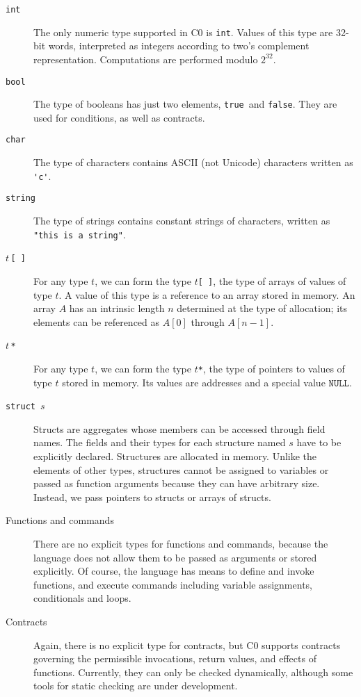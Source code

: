 \documentclass[11pt]{article}
\newcommand{\tint}{\texttt{int}}
\newcommand{\tbool}{\texttt{bool}}
\newcommand{\vtrue}{\texttt{true}}
\newcommand{\vfalse}{\texttt{false}}
\newcommand{\tstring}{\texttt{string}}
\newcommand{\tchar}{\texttt{char}}
\newcommand{\tarray}{\texttt{[\,]}}
\newcommand{\tstar}{\texttt{*}}
\newcommand{\vnull}{\texttt{NULL}}
\newcommand{\tstruct}{\texttt{struct}}
\begin{document}
\begin{description}
\item[\tint] The only numeric type supported in C0 is \tint.  Values of
  this type are 32-bit words, interpreted as integers according to
  two's complement representation.  Computations are performed
  modulo $2^{32}$.
\item[\tbool] The type of booleans has just two elements, \vtrue\ and \vfalse.
  They are used for conditions, as well as contracts.
\item[\tchar] The type of characters contains ASCII (not Unicode)
  characters written as \lstinline!'c'!.
\item[\tstring] The type of strings contains constant strings of
  characters, written as \lstinline'"this is a string"'.
\item[$t$\,\tarray] For any type $t$, we can form the type $t$\tarray,
  the type of arrays of values of type $t$.  A value of this type is a
  reference to an array stored in memory.  An array $A$ has an
  intrinsic length $n$ determined at the type of allocation; its
  elements can be referenced as $A[0]$ through $A[n-1]$.
\item[$t$\,\tstar] For any type $t$, we can form the type $t$\tstar, the
  type of pointers to values of type $t$ stored in memory.  Its values
  are addresses and a special value $\vnull$.
\item[\tstruct\ $s$] Structs are aggregates whose members can be
  accessed through field names.  The fields and their types for each
  structure named $s$ have to be explicitly declared.  Structures are
  allocated in memory.  Unlike the elements of other types, structures
  cannot be assigned to variables or passed as function arguments
  because they can have arbitrary size.  Instead, we pass pointers to
  structs or arrays of structs.
\item[Functions and commands] There are no explicit types for
  functions and commands, because the language does not allow them to
  be passed as arguments or stored explicitly.  Of course, the
  language has means to define and invoke functions, and execute
  commands including variable assignments, conditionals and loops.
\item[Contracts] Again, there is no explicit type for contracts,
  but C0 supports contracts governing the permissible invocations,
  return values, and effects of functions.  Currently, they can only
  be checked dynamically, although some tools for static checking
  are under development.
\end{description}
\end{document}
